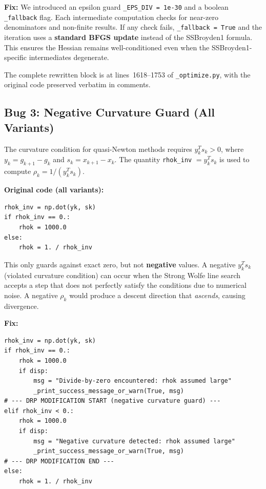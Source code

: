 \documentclass[11pt,a4paper]{article}
\begin{document}
\textbf{Fix:} We introduced an epsilon guard \texttt{\_EPS\_DIV =
1e-30} and a boolean \texttt{\_fallback} flag.  Each intermediate
computation checks for near-zero denominators and non-finite results.
If any check fails, \texttt{\_fallback = True} and the iteration uses
a \textbf{standard BFGS update} instead of the SSBroyden1 formula.
This ensures the Hessian remains well-conditioned even when the
SSBroyden1-specific intermediates degenerate.

The complete rewritten block is at lines~1618--1753 of
\texttt{\_optimize.py}, with the original code preserved verbatim in
comments.

\subsection{Bug 3: Negative Curvature Guard (All Variants)}
\label{sec:bug-curvature}

The curvature condition for quasi-Newton methods requires $y_k^T s_k >
0$, where $y_k = g_{k+1} - g_k$ and $s_k = x_{k+1} - x_k$.  The
quantity \texttt{rhok\_inv} $= y_k^T s_k$ is used to compute $\rho_k =
1 / (y_k^T s_k)$.

\textbf{Original code (all variants):}
\begin{lstlisting}[caption={Original rhok\_inv guard}]
rhok_inv = np.dot(yk, sk)
if rhok_inv == 0.:
    rhok = 1000.0
else:
    rhok = 1. / rhok_inv
\end{lstlisting}

This only guards against exact zero, but not \textbf{negative} values.
A negative $y_k^T s_k$ (violated curvature condition) can occur when the
Strong Wolfe line search accepts a step that does not perfectly satisfy
the conditions due to numerical noise.  A negative $\rho_k$ would
produce a descent direction that \emph{ascends}, causing divergence.

\textbf{Fix:}
\begin{lstlisting}[caption={New negative curvature guard (lines 1555--1568)}]
rhok_inv = np.dot(yk, sk)
if rhok_inv == 0.:
    rhok = 1000.0
    if disp:
        msg = "Divide-by-zero encountered: rhok assumed large"
        _print_success_message_or_warn(True, msg)
# --- DRP MODIFICATION START (negative curvature guard) ---
elif rhok_inv < 0.:
    rhok = 1000.0
    if disp:
        msg = "Negative curvature detected: rhok assumed large"
        _print_success_message_or_warn(True, msg)
# --- DRP MODIFICATION END ---
else:
    rhok = 1. / rhok_inv
\end{lstlisting}
\end{document}
